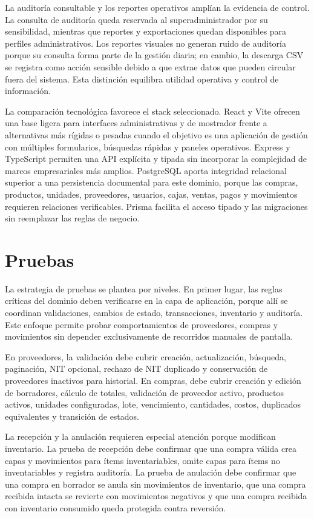 La auditoría consultable y los reportes operativos amplían la evidencia de control. La consulta de auditoría queda reservada al superadministrador por su sensibilidad, mientras que reportes y exportaciones quedan disponibles para perfiles administrativos. Los reportes visuales no generan ruido de auditoría porque su consulta forma parte de la gestión diaria; en cambio, la descarga CSV se registra como acción sensible debido a que extrae datos que pueden circular fuera del sistema. Esta distinción equilibra utilidad operativa y control de información.

La comparación tecnológica favorece el stack seleccionado. React y Vite ofrecen una base ligera para interfaces administrativas y de mostrador frente a alternativas más rígidas o pesadas cuando el objetivo es una aplicación de gestión con múltiples formularios, búsquedas rápidas y paneles operativos. Express y TypeScript permiten una API explícita y tipada sin incorporar la complejidad de marcos empresariales más amplios. PostgreSQL aporta integridad relacional superior a una persistencia documental para este dominio, porque las compras, productos, unidades, proveedores, usuarios, cajas, ventas, pagos y movimientos requieren relaciones verificables. Prisma facilita el acceso tipado y las migraciones sin reemplazar las reglas de negocio.



\section{Pruebas}

La estrategia de pruebas se plantea por niveles. En primer lugar, las reglas críticas del dominio deben verificarse en la capa de aplicación, porque allí se coordinan validaciones, cambios de estado, transacciones, inventario y auditoría. Este enfoque permite probar comportamientos de proveedores, compras y movimientos sin depender exclusivamente de recorridos manuales de pantalla.

En proveedores, la validación debe cubrir creación, actualización, búsqueda, paginación, NIT opcional, rechazo de NIT duplicado y conservación de proveedores inactivos para historial. En compras, debe cubrir creación y edición de borradores, cálculo de totales, validación de proveedor activo, productos activos, unidades configuradas, lote, vencimiento, cantidades, costos, duplicados equivalentes y transición de estados.

La recepción y la anulación requieren especial atención porque modifican inventario. La prueba de recepción debe confirmar que una compra válida crea capas y movimientos para ítems inventariables, omite capas para ítems no inventariables y registra auditoría. La prueba de anulación debe confirmar que una compra en borrador se anula sin movimientos de inventario, que una compra recibida intacta se revierte con movimientos negativos y que una compra recibida con inventario consumido queda protegida contra reversión.

